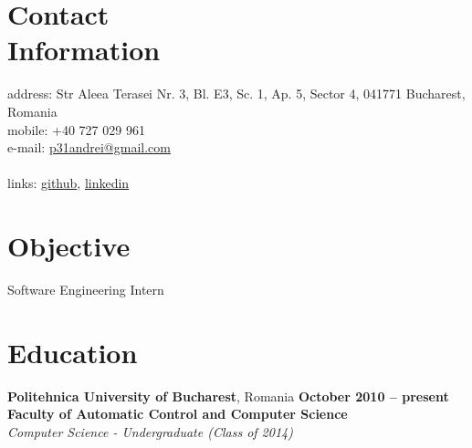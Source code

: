 \documentclass[margin,line]{resume}
\begin{document}
\begin{resume}

    \section{\mysidestyle Contact\\Information}

	address: Str Aleea Terasei Nr. 3, Bl. E3, Sc. 1, Ap. 5, Sector 4, 041771 Bucharest, Romania\\
	mobile: +40 727 029 961              \\
	e-mail:  \href{mailto:p31andrei@gmail.com}{p31andrei@gmail.com}  \vspace{0mm}\\\vspace{-4.5mm}\\%
	links: \href{https://github.com/andreip/}{github}, \href{http://www.linkedin.com/profile/view?id=143805798}{linkedin}

    \section{\mysidestyle Objective}

	Software Engineering Intern 


    \section{\mysidestyle Education}

    \textbf{Politehnica University of Bucharest}, Romania \hfill \textbf{ October 2010 -- present}\vspace{1mm}\\%
	\small{\textbf{Faculty of Automatic Control and Computer Science}}\\
    \textsl{Computer Science - Undergraduate (Class of 2014)}



\end{resume}
\end{document}
